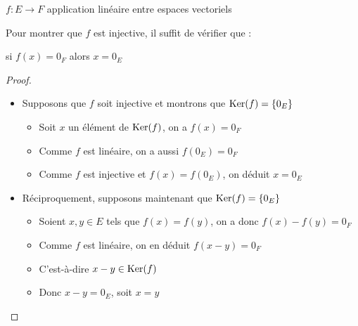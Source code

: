 \begin{frame}
$f : E \longrightarrow F$ application linéaire entre espaces vectoriels
\begin{theoreme}
\end{theoreme} 
\pause
Pour montrer que $f$ est injective, il suffit de vérifier que : \\
\centerline{si $f(x)=0_F$ alors $x=0_E$}

\pause

\begin{proof}\pause
\vspace*{-1ex}
\begin{itemize}
  \item Supposons que $f$ soit injective et montrons que $\mathop{\text{Ker}}\nolimits(f)=\{0_E\}$
  \pause
  \begin{itemize}
    \item Soit $x$ un élément de $\mathop{\text{Ker}}\nolimits(f)$, on a $f(x)=0_{F}$
    \pause
    \item Comme $f$ est linéaire, on a aussi $f(0_{E})=0_{F}$
    \pause
    \item Comme $f$ est injective et $f(x)=f(0_{E})$, on déduit $x=0_{E}$
  \end{itemize}
\vspace*{-1ex}
\pause
  \item Réciproquement, supposons maintenant que $\mathop{\text{Ker}}\nolimits (f)=\{0_E\}$
  \pause
\vspace*{-1ex} 
  \begin{itemize}
    \item Soient $x, y \in E$ tels que $f(x)=f(y)$, on a donc $f(x)-f(y)=0_{F}$
    \pause
    \item Comme $f$ est linéaire, on en déduit $f(x-y)=0_{F}$
    \pause
    \item C'est-à-dire $x-y \in \mathop{\text{Ker}}\nolimits (f)$
    \pause
    \item Donc $x-y=0_{E}$, soit $x=y$   \qedhere
  \end{itemize}
\end{itemize}
\vspace*{-2.5ex} 
\end{proof}
\end{frame}



